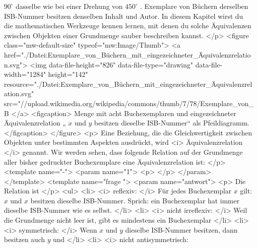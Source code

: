    $90^\circ$
   dasselbe wie bei einer Drehung von
   $450^\circ$
   . Exemplare von Büchern derselben ISB-Nummer besitzen denselben Inhalt und Autor. In diesem Kapitel wirst du die mathematischen Werkzeuge kennen lernen, mit denen du solche Äquivalenzen zwischen Objekten einer Grundmenge sauber beschreiben kannst.
  </p>
  <figure class="mw-default-size" typeof="mw:Image/Thumb">
   <a href="./Datei:Exemplare_von_Büchern_mit_eingezeichneter_Äquivalenzrelation.svg">
    <img data-file-height="826" data-file-type="drawing" data-file-width="1284" height="142" resource="./Datei:Exemplare_von_Büchern_mit_eingezeichneter_Äquivalenzrelation.svg" src="//upload.wikimedia.org/wikipedia/commons/thumb/7/78/Exemplare_von_B%
   </a>
   <figcaption>
    Menge mit acht Buchexemplaren und eingezeichneter Äquivalenzrelation „
    $x$
    und
    $y$
    besitzen dieselbe ISB-Nummer“ als Pfeildiagramm.
   </figcaption>
  </figure>
  <p>
   Eine Beziehung, die die Gleichwertigkeit zwischen Objekten unter bestimmten Aspekten ausdrückt, wird
   <i>
    Äquivalenzrelation
   </i>
   genannt. Wir werden sehen, dass folgende Relation auf der Grundmenge aller bisher gedruckter Buchexemplare eine Äquivalenzrelation ist:
  </p>
  <template name="-">
   <param name="1">
    <p>
    </p>
   </param>
  </template>
  <template name="frage
 ">
   <param name="antwort">
    <p>
     Die Relation ist
    </p>
    <ul>
     <li>
      <i>
       reflexiv:
      </i>
      Für jedes Buchexemplar
      $x$
      gilt:
      $x$
      und
      $x$
      besitzen dieselbe ISB-Nummer. Sprich: ein Buchexemplar hat immer dieselbe ISB-Nummer wie es selbst.
     </li>
     <li>
      <i>
       nicht irreflexiv:
      </i>
      Weil die Grundmenge nicht leer ist, gibt es mindestens ein Buchexemplar
     </li>
     <li>
      <i>
       symmetrisch:
      </i>
      Wenn
      $x$
      und
      $y$
      dieselbe ISB-Nummer besitzen, dann besitzen auch
      $y$
      und
     </li>
     <li>
      <i>
       nicht antisymmetrisch:
